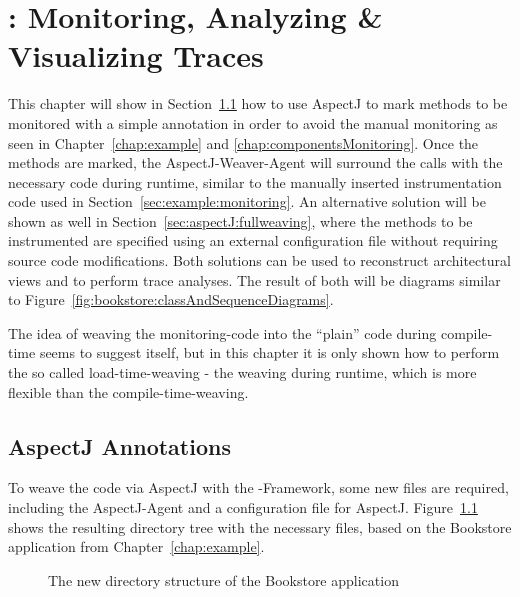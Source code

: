 % 

\chapter{\KiekerTraceAnalysis{}: Monitoring, Analyzing \& Visualizing Traces}\label{chap:aspectJ}

This chapter will show in Section~\ref{sec:aspectJ:annotation} how
to use AspectJ to mark methods to be monitored with a simple annotation
in order to avoid the manual monitoring as seen in Chapter~\ref{chap:example}
and \ref{chap:componentsMonitoring}. Once the methods are marked, the AspectJ-Weaver-Agent
will surround the calls with the necessary code during runtime, similar
to the manually inserted instrumentation code used in Section~\ref{sec:example:monitoring}.
An alternative solution will be shown as well in Section~\ref{sec:aspectJ:fullweaving}, %
where the methods to be instrumented are specified using an external configuration file %
without requiring source code modifications. Both solutions
can be used to reconstruct architectural views and to perform trace
analyses. The result of both will be diagrams similar to Figure~\ref{fig:bookstore:classAndSequenceDiagrams}.

The idea of weaving the monitoring-code into the ``plain'' code
during compile-time seems to suggest itself, but in this chapter it
is only shown how to perform the so called load-time-weaving - the
weaving during runtime, which is more flexible than the compile-time-weaving.

\section{AspectJ Annotations}\label{sec:aspectJ:annotation}

To weave the code via AspectJ with the \Kieker{}-Framework,
some new files are required, including the AspectJ-Agent and a configuration
file for AspectJ. Figure~\ref{fig:bookstoreAOP:dirStructure} shows the resulting %
directory tree with the necessary files, based on the Bookstore application from %
Chapter~\ref{chap:example}.

\begin{figure}[H]
\begin{graybox}
\end{graybox}

\caption{The new directory structure of the Bookstore application}
\label{fig:bookstoreAOP:dirStructure}
\end{figure}

